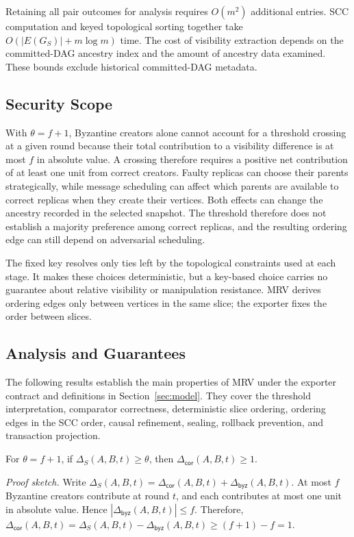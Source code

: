 Retaining all pair outcomes for analysis requires $O(m^2)$ additional entries. SCC computation and keyed topological sorting together take $O(|E(G_S)|+m\log m)$ time. The cost of visibility extraction depends on the committed-DAG ancestry index and the amount of ancestry data examined. These bounds exclude historical committed-DAG metadata.


\subsection{Security Scope}
\label{sec:security_scope}

With $\theta=f+1$, Byzantine creators alone cannot account for a threshold crossing at a given round because their total contribution to a visibility difference is at most $f$ in absolute value. A crossing therefore requires a positive net contribution of at least one unit from correct creators. Faulty replicas can choose their parents strategically, while message scheduling can affect which parents are available to correct replicas when they create their vertices. Both effects can change the ancestry recorded in the selected snapshot. The threshold therefore does not establish a majority preference among correct replicas, and the resulting ordering edge can still depend on adversarial scheduling.

The fixed key resolves only ties left by the topological constraints used at each stage. It makes these choices deterministic, but a key-based choice carries no guarantee about relative visibility or manipulation resistance.
MRV derives ordering edges only between vertices in the same slice; the exporter fixes the order between slices.




\subsection{Analysis and Guarantees}
\label{sec:analysis}

The following results establish the main properties of MRV under the exporter contract and definitions in Section~\ref{sec:model}. They cover the threshold interpretation, comparator correctness, deterministic slice ordering, ordering edges in the SCC order, causal refinement, sealing, rollback prevention, and transaction projection.

\begin{lemma}
\label{lem:correct_contribution}
For $\theta=f+1$, if $\Delta_S(A,B,t)\geq\theta$, then
$\Delta_{\mathsf{cor}}(A,B,t)\geq1$.
\end{lemma}
\noindent\emph{Proof sketch.}
Write $\Delta_S(A,B,t)=\Delta_{\mathsf{cor}}(A,B,t) +\Delta_{\mathsf{byz}}(A,B,t)$.
At most $f$ Byzantine creators contribute at round $t$, and each contributes at most one unit in absolute value. Hence
$|\Delta_{\mathsf{byz}}(A,B,t)|\leq f$. Therefore,
$\Delta_{\mathsf{cor}}(A,B,t)
=\Delta_S(A,B,t)-\Delta_{\mathsf{byz}}(A,B,t)
\geq(f+1)-f=1$.

